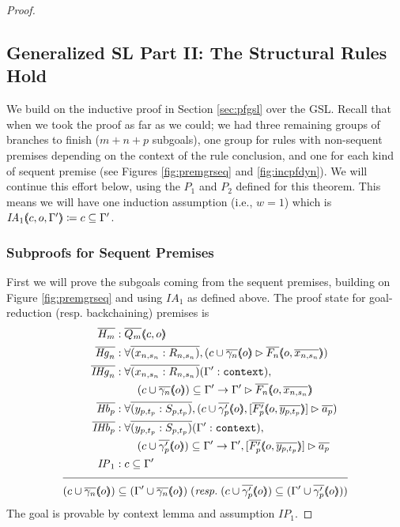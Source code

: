 \begin{proof}
\subsection{Generalized SL Part II: The Structural Rules Hold}
\label{subsec:structpf}

We build on the inductive proof in Section \ref{sec:pfgsl} over the GSL. Recall that when we took the proof as far as we could; we had three remaining groups of branches to finish ($m + n + p$ subgoals), one group for rules with non-sequent premises depending on the context of the rule conclusion, and one for each kind of sequent premise (see Figures \ref{fig:premgrseq} and \ref{fig:incpfdyn}). We will continue this effort below, using the $P_1$ and $P_2$ defined for this theorem. This means we will have one induction assumption (i.e., $w = 1$) which is $\mathit{IA}_1 (\hspace{-0.35em} \langle c , o , \Gamma'{} \rangle \hspace{-0.35em}) \coloneqq c \subseteq \Gamma'{}$.


\subsubsection{Subproofs for Sequent Premises}

First we will prove the subgoals coming from the sequent premises, building on Figure \ref{fig:premgrseq} and using $\mathit{IA}_1$ as defined above. The proof state for goal-reduction (resp. backchaining) premises is
\begin{align*}
\ol{H_m} &: \ol{Q_m} \args{c , o} \\
\ol{\mathit{Hg}_n} &: \forall \ol{(x_{n,s_n} : R_{n,s_n})}, (\seqsl[c \cup \ol{\gamma_n} \args{o}]{\ol{F_n} \args{o , \ol{x_{n,s_n}}})} \\
\ol{\mathit{IHg}_n} &: \forall \ol{(x_{n,s_n} : R_{n,s_n})} (\inddyncon{} : \sltm{context}), \\
& \qquad (c \cup \ol{\gamma_n} \args{o}) \subseteq \inddyncon{} \rightarrow \seqsl[\inddyncon{}]{\ol{F_n} \args{o , \ol{x_{n,s_n}}}} \\
\ol{\mathit{Hb}_p} &: \forall \ol{(y_{p,t_p} : S_{p,t_p})}, (\bchsl[c \cup \ol{\gamma'_p} \args{o}]{\ol{F'_p} \args{o , \ol{y_{p,t_p}}}}{\ol{a_p}}) \\
\ol{\mathit{IHb}_p} &: \forall \ol{(y_{p,t_p} : S_{p,t_p})} (\inddyncon{} : \sltm{context}), \\
& \qquad (c \cup \ol{\gamma'_p} \args{o}) \subseteq \inddyncon{} \rightarrow \bchsl[\inddyncon{}]{\ol{F'_p} \args{o , \ol{y_{p,t_p}}}}{\ol{a_p}} \\
\mathit{IP}_1 &: c \subseteq \inddyncon{} \\[\pfshift{}]
\cline{1-2}
(c \cup \ol{\gamma_n} \args{o}) & \subseteq (\inddyncon{} \cup \ol{\gamma_n} \args{o}) \; (\mathit{resp.} \; (c \cup \ol{\gamma'_p} \args{o}) \subseteq (\inddyncon{} \cup \ol{\gamma'_p} \args{o}))
\end{align*}
The goal is provable by context lemma  and assumption $\mathit{IP}_1$.



\end{proof}
